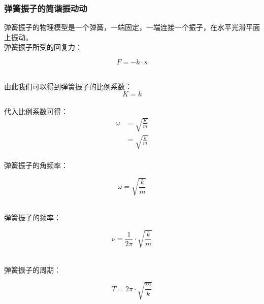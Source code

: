 \documentclass[UTF8]{ctexart}
\begin{document}
\newpage

\subsubsection{弹簧振子的简谐振动动}
    弹簧振子的物理模型是一个弹簧，一端固定，一端连接一个振子，在水平光滑平面上振动。\\[3mm]
    弹簧振子所受的回复力：
    \setcounter{equation}{0}
    \begin{large}
        \begin{equation*}
            F=-k\cdot s
        \end{equation*}
    \end{large}\\
    由此我们可以得到弹簧振子的比例系数：
    \begin{equation}
        K=k
    \end{equation}\\
    代入比例系数可得：
    \begin{align}
        \omega
        &=\sqrt{\frac{K}{m}}\\[3mm]
        &=\sqrt{\frac{k}{m}}
    \end{align}\\
    弹簧振子的角频率：
    \begin{large}
        \begin{equation*}
            \omega=\sqrt{\frac{k}{m}}
        \end{equation*}
    \end{large}\\
    弹簧振子的频率：
    \begin{large}
        \begin{equation*}
            \nu=\frac{1}{2\pi}\cdot\sqrt{\frac{k}{m}}
        \end{equation*}
    \end{large}\\
    弹簧振子的周期：
    \begin{large}
        \begin{equation*}
            T=2\pi\cdot\sqrt{\frac{m}{k}}
        \end{equation*}
    \end{large}

\newpage
\end{document}
